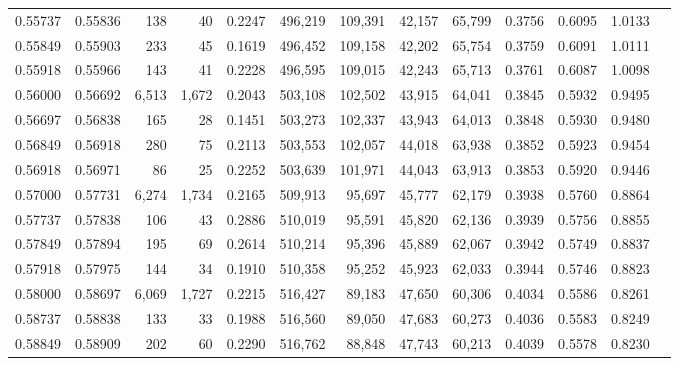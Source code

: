 \begin{tabular}{rrrrrrrrrrrrr}
0.55737 & 0.55836 &    138 &    40 &                                     0.2247 & 496,219 & 109,391 &  42,157 &  65,799 & 0.3756 & 0.6095 & 1.0133 \\
0.55849 & 0.55903 &    233 &    45 &                                     0.1619 & 496,452 & 109,158 &  42,202 &  65,754 & 0.3759 & 0.6091 & 1.0111 \\
0.55918 & 0.55966 &    143 &    41 &                                     0.2228 & 496,595 & 109,015 &  42,243 &  65,713 & 0.3761 & 0.6087 & 1.0098 \\
0.56000 & 0.56692 &  6,513 & 1,672 &                                     0.2043 & 503,108 & 102,502 &  43,915 &  64,041 & 0.3845 & 0.5932 & 0.9495 \\
0.56697 & 0.56838 &    165 &    28 &                                     0.1451 & 503,273 & 102,337 &  43,943 &  64,013 & 0.3848 & 0.5930 & 0.9480 \\
0.56849 & 0.56918 &    280 &    75 &                                     0.2113 & 503,553 & 102,057 &  44,018 &  63,938 & 0.3852 & 0.5923 & 0.9454 \\
0.56918 & 0.56971 &     86 &    25 &                                     0.2252 & 503,639 & 101,971 &  44,043 &  63,913 & 0.3853 & 0.5920 & 0.9446 \\
0.57000 & 0.57731 &  6,274 & 1,734 &                                     0.2165 & 509,913 &  95,697 &  45,777 &  62,179 & 0.3938 & 0.5760 & 0.8864 \\
0.57737 & 0.57838 &    106 &    43 &                                     0.2886 & 510,019 &  95,591 &  45,820 &  62,136 & 0.3939 & 0.5756 & 0.8855 \\
0.57849 & 0.57894 &    195 &    69 &                                     0.2614 & 510,214 &  95,396 &  45,889 &  62,067 & 0.3942 & 0.5749 & 0.8837 \\
0.57918 & 0.57975 &    144 &    34 &                                     0.1910 & 510,358 &  95,252 &  45,923 &  62,033 & 0.3944 & 0.5746 & 0.8823 \\
0.58000 & 0.58697 &  6,069 & 1,727 &                                     0.2215 & 516,427 &  89,183 &  47,650 &  60,306 & 0.4034 & 0.5586 & 0.8261 \\
0.58737 & 0.58838 &    133 &    33 &                                     0.1988 & 516,560 &  89,050 &  47,683 &  60,273 & 0.4036 & 0.5583 & 0.8249 \\
0.58849 & 0.58909 &    202 &    60 &                                     0.2290 & 516,762 &  88,848 &  47,743 &  60,213 & 0.4039 & 0.5578 & 0.8230 \\

\end{tabular}
